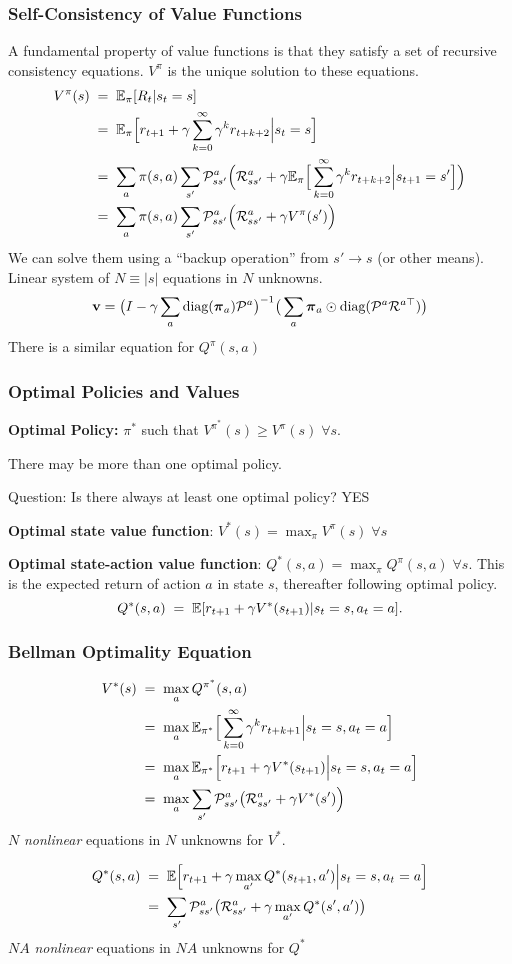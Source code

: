 \begin{frame}
\frametitle{Self-Consistency of Value Functions}

A fundamental property of value functions is that they satisfy a set
of recursive consistency equations. $V^\pi$ is the unique solution to
these equations. 
\[
\begin{split}
V^\pi(s) \;&=\;\mathbb{E}_\pi[R_t|s_t=s]\\
&=\;\mathbb{E}_\pi\Big[r_{t+1} + \gamma \sum_{k=0}^\infty \gamma^k
r_{t+k+2}\Big| s_t=s\Big]\\ 
&=\;\sum_a \pi(s,a) \sum_{s'} {\mathcal P}_{ss'}^a \Big( {\mathcal R}_{ss'}^a + \gamma \mathbb{E}_\pi
\Big[\sum_{k=0}^\infty \gamma^k r_{t+k+2} \Big| s_{t+1}=s'\Big] \Big) \\
&=\;\sum_a\pi(s,a)\sum_{s'}{\mathcal P}_{ss'}^a\Big({\mathcal R}_{ss'}^a+\gamma V^\pi(s')\Big) 
\end{split}
\]
We can solve them using a ``backup operation'' from $s'\rightarrow s$ (or
other means).  Linear system of $N\equiv|s|$ equations in $N$ unknowns.
\[
{\mathbf v} = \big(I-\gamma\sum_a\mbox{diag}(\boldsymbol{\pi}_a){\mathcal P}^a\big)^{-1}
\big(\sum_a\boldsymbol{\pi}_a\odot\mbox{diag}({\mathcal P}^a{\mathcal R}^{a\top})\big) 
\]
There is a similar equation for $Q^{\pi}(s,a)$
\end{frame}

\begin{frame}
\frametitle{Optimal Policies and Values}

{\bf Optimal Policy:} $\pi^*$ such that $V^{\pi^*}(s) \ge V^\pi(s) \;
\forall s$.

There may be more than one optimal policy.

Question: Is there always at least one optimal policy? YES

{\bf Optimal state value function}: $V^*(s) = \max_\pi V^\pi(s) \;
\forall s$ 

{\bf Optimal state-action value function}: $Q^*(s,a) = \max_\pi
Q^\pi(s,a) \; \forall s$. This is the expected return of action $a$ in
state $s$, thereafter following optimal policy. 
\[
Q^*(s,a)\;=\;\mathbb{E}[r_{t+1} + \gamma V^*(s_{t+1}) |s_t=s, a_t=a]. 
\]
\end{frame}

\begin{frame}
\frametitle{Bellman Optimality Equation}
\[
\begin{split}
V^*(s)\;&=\;\max_a Q^{\pi^*}(s,a)\\
&=\;\max_a\mathbb{E}_{\pi^*}\Big[\sum_{k=0}^\infty \gamma^k r_{t+k+1}\Big|s_t=s, a_t=a \Big]\\ 
&=\;\max_a\mathbb{E}_{\pi^*}\Big[r_{t+1} + \gamma V^*(s_{t+1}) \Big|s_t=s, a_t=a \Big]\\
&=\;\max_a \sum_{s'} {\mathcal P}_{ss'}^a \big({\mathcal R}_{ss'}^a + \gamma V^*(s')\Big)
\end{split}
\]
$N$ {\em nonlinear} equations in $N$ unknowns for $V^*$.

\[
\begin{split}
Q^*(s,a)\;&=\;\mathbb{E}\Big[r_{t+1} + \gamma \max_{a'} Q^*(s_{t+1},a')
\Big| s_t=s, a_t=a \Big]\\
&=\;\sum_{s'} {\mathcal P}_{ss'}^a \big( {\mathcal R}_{ss'}^a + \gamma \max_{a'} Q^*(s',a')\big)
\end{split}
\]
$NA$ {\em nonlinear} equations in $NA$ unknowns for $Q^*$
\end{frame}

